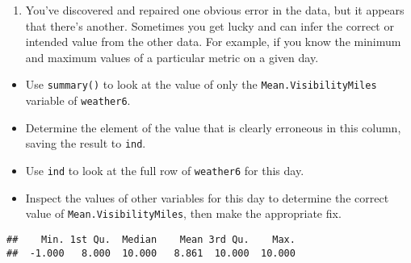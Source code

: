 \documentclass[]{article}
\newenvironment{Shaded}{\begin{snugshade}}{\end{snugshade}}
\newcommand{\KeywordTok}[1]{\textcolor[rgb]{0.13,0.29,0.53}{\textbf{#1}}}
\newcommand{\DecValTok}[1]{\textcolor[rgb]{0.00,0.00,0.81}{#1}}
\newcommand{\StringTok}[1]{\textcolor[rgb]{0.31,0.60,0.02}{#1}}
\newcommand{\CommentTok}[1]{\textcolor[rgb]{0.56,0.35,0.01}{\textit{#1}}}
\newcommand{\OperatorTok}[1]{\textcolor[rgb]{0.81,0.36,0.00}{\textbf{#1}}}
\newcommand{\NormalTok}[1]{#1}
\providecommand{\tightlist}{%
  \setlength{\itemsep}{0pt}\setlength{\parskip}{0pt}}
\begin{document}
\begin{Shaded}
\end{Shaded}

\begin{enumerate}
\def\labelenumi{\arabic{enumi}.}
\setcounter{enumi}{9}
\tightlist
\item
  You've discovered and repaired one obvious error in the data, but it
  appears that there's another. Sometimes you get lucky and can infer
  the correct or intended value from the other data. For example, if you
  know the minimum and maximum values of a particular metric on a given
  day.
\end{enumerate}

\begin{itemize}
\item
  Use \texttt{summary()} to look at the value of only the
  \texttt{Mean.VisibilityMiles} variable of \texttt{weather6}.
\item
  Determine the element of the value that is clearly erroneous in this
  column, saving the result to \texttt{ind}.
\item
  Use \texttt{ind} to look at the full row of \texttt{weather6} for this
  day.
\item
  Inspect the values of other variables for this day to determine the
  correct value of \texttt{Mean.VisibilityMiles}, then make the
  appropriate fix.
\end{itemize}

\begin{Shaded}
\end{Shaded}

\begin{verbatim}
##    Min. 1st Qu.  Median    Mean 3rd Qu.    Max. 
##  -1.000   8.000  10.000   8.861  10.000  10.000
\end{verbatim}

\begin{Shaded}
\end{Shaded}
\end{document}
